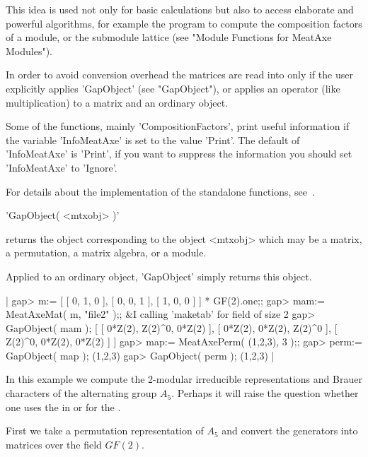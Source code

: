 This idea is used not only for basic calculations but also to access
elaborate and powerful algorithms, for example the program to compute the
composition factors of a module, or the submodule lattice (see "Module
Functions for MeatAxe Modules").

In order to avoid conversion overhead the {\MeatAxe} matrices are read into
{\GAP} only if the user explicitly applies 'GapObject' (see "GapObject"),
or applies an operator (like multiplication) to a {\MeatAxe} matrix and an
ordinary {\GAP} object.

Some of the functions, mainly 'CompositionFactors', print useful information
if the variable 'InfoMeatAxe' is set to the value 'Print'.
The default of 'InfoMeatAxe' is 'Print', if you want to suppress the
information you should set 'InfoMeatAxe' to 'Ignore'.

For details about the implementation of the standalone functions,
see~\cite{Rin93}.


'GapObject( <mtxobj> )'

returns the {\GAP} object corresponding to the {\MeatAxe} object <mtxobj>
which may be a {\MeatAxe} matrix, a {\MeatAxe} permutation, a {\MeatAxe}
matrix algebra, or a {\MeatAxe} module.

Applied to an ordinary {\GAP} object, 'GapObject' simply returns this object.

|    gap> m:= [ [ 0, 1, 0 ], [ 0, 0, 1 ], [ 1, 0, 0 ] ] * GF(2).one;;
    gap> mam:= MeatAxeMat( m, "file2" );;
    &I  calling 'maketab' for field of size 2
    gap> GapObject( mam );
    [ [ 0*Z(2), Z(2)^0, 0*Z(2) ], [ 0*Z(2), 0*Z(2), Z(2)^0 ], 
      [ Z(2)^0, 0*Z(2), 0*Z(2) ] ]
    gap> map:= MeatAxePerm( (1,2,3), 3 );;
    gap> perm:= GapObject( map );
    (1,2,3)
    gap> GapObject( perm );
    (1,2,3) |


In this example we compute the 2-modular irreducible representations and
Brauer characters of the alternating group $A_5$.
Perhaps it will raise the question whether one uses the {\MeatAxe} in {\GAP}
or {\GAP} for the {\MeatAxe}.

First we take a permutation representation of $A_5$ and convert the
generators into {\MeatAxe} matrices over the field $GF(2)$.

